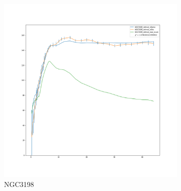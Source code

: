 \documentclass[reprint,%
 amsmath,amssymb,
 aps,
]{revtex4-1}
\begin{document}
%
%
%
\clearpage
 \begin{figure}[h]
\begin{subfigure}{.5\textwidth}
  \centering
  \includegraphics[width=.8\linewidth]{figures/NGC3198_rotmod_XueSofue.png}
  \caption{NGC3198}
  \label{fig:sfig21}
\end{subfigure}%
\caption{ }
\label{fig:fig7331}
\end{figure}
 
  
 

    
     

 
\end{document}
